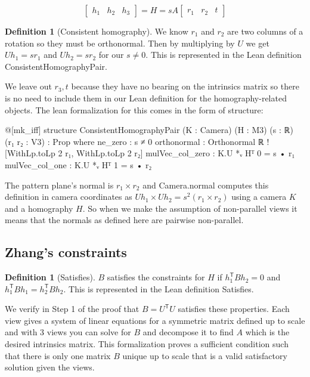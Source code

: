 \documentclass[10pt]{article}
\theoremstyle{plain}
\theoremstyle{definition}
\newtheorem{definition}[theorem]{Definition}
\theoremstyle{remark}
\newcommand{\T}{^{\mathsf{T}}}
\newcommand{\lean}[1]{{\ttfamily\let\us\_\def\_{\us\allowbreak}#1}}
\begin{document}
\[
\begin{bmatrix} h_1 & h_2 & h_3 \end{bmatrix} = H = sA \begin{bmatrix} r_1 & r_2 & t\end{bmatrix}
\]

\begin{definition}[Consistent homography]
We know $r_1$ and $r_2$ are two columns of a rotation so they must be orthonormal. Then by multiplying by $U$ we get $Uh_1=sr_1$ and $Uh_2=sr_2$ for our $s \neq 0$. This is represented in the Lean definition \lean{ConsistentHomographyPair}. 
\end{definition}

We leave out $r_3,t$ because they have no bearing on the intrinsics matrix so there is no need to include them in our Lean definition for the homography-related objects. The lean formalization for this comes in the form of structure:
\begin{leancode}
@[mk_iff]
structure ConsistentHomographyPair (K : Camera) (H : M3) (s : ℝ) (r₁ r₂ : V3) : Prop where
    ne_zero : s ≠ 0
    orthonormal : Orthonormal ℝ ![WithLp.toLp 2 r₁, WithLp.toLp 2 r₂]
    mulVec_col_zero : K.U *ᵥ Hᵀ 0 = s • r₁
    mulVec_col_one : K.U *ᵥ Hᵀ 1 = s • r₂
\end{leancode}

The pattern plane's normal is $r_1 \times r_2$ and \lean{Camera.normal} computes this definition in camera coordinates as $Uh_1 \times Uh_2=s^2(r_1 \times r_2)$ using a camera $K$ and a homography $H$. So when we make the assumption of non-parallel views it means that the normals as defined here are pairwise non-parallel.

\subsection{Zhang's constraints}
\begin{definition}[Satisfies]
    $B$ satisfies the constraints for $H$ if $h_1\T Bh_2=0$ and $h_1\T Bh_1=h_2\T Bh_2$. This is represented in the Lean definition \lean{Satisfies}.
\end{definition}

We verify in Step 1 of the proof that $B=U\T U$ satisfies these properties. Each view gives a system of linear equations for a symmetric matrix defined up to scale and with 3 views you can solve for $B$ and decompose it to find $A$ which is the desired intrinsics matrix. This formalization proves a sufficient condition such that there is only one matrix $B$ unique up to scale that is a valid satisfactory solution given the views.
\end{document}
